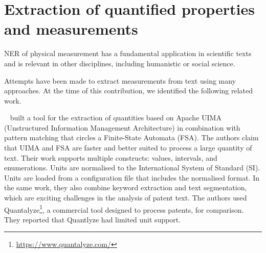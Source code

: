 

\section{Extraction of quantified properties and measurements} 
NER of physical measurement has a fundamental application in scientific texts and is relevant in other disciplines, including humanistic or social science. 

Attempts have been made to extract measurements from text using many approaches. At the time of this contribution, we identified the following related work. 

~\cite{aras2014applications} built a tool for the extraction of quantities based on Apache UIMA (Unstructured Information Management Architecture) in combination with pattern matching that circles a Finite-State Automata (FSA). 
The authors claim that UIMA and FSA are faster and better suited to process a large quantity of text.
Their work supports multiple constructs: values, intervals, and enumerations. Units are normalised to the International System of Standard (SI). 
Units are loaded from a configuration file that includes the normalised format. In the same work, they also combine keyword extraction and text segmentation, which are exciting challenges in the analysis of patent text. 
The authors used Quantalyze\footnote{\url{https://www.quantalyze.com/}}, a commercial tool designed to process patents, for comparison. They reported that Quantlyze had limited unit support. 


